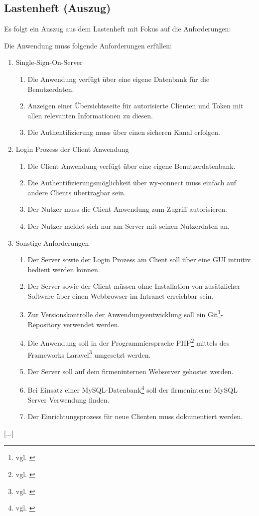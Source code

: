 \newpage
\subsection{Lastenheft (Auszug)}
\label{app:Lastenheft}
Es folgt ein Auszug aus dem Lastenheft mit Fokus auf die Anforderungen:

Die Anwendung muss folgende Anforderungen erfüllen: 
\begin{enumerate}[itemsep=0em,partopsep=0em,parsep=0em,topsep=0em]
\item Single-Sign-On-Server
	\begin{enumerate}
	\item Die Anwendung verfügt über eine eigene Datenbank für die Benutzerdaten.
	\item Anzeigen einer Übersichtsseite für autorisierte Clienten und Token mit allen relevanten Informationen zu diesen.
	\item Die Authentifizierung muss über einen sicheren Kanal erfolgen.
	\end{enumerate}
\item Login Prozess der Client Anwendung
	\begin{enumerate}
	\item Die Client Anwendung verfügt über eine eigene Benutzerdatenbank.
	\item Die Authentifizierungsmöglichkeit über wy-connect muss einfach auf andere Clients übertragbar sein.
	\item Der Nutzer muss die Client Anwendung zum Zugriff autorisieren.
	\item Der Nutzer meldet sich nur am Server mit seinen Nutzerdaten an.
	\end{enumerate}
\item Sonstige Anforderungen
	\begin{enumerate}
	\item Der Server sowie der Login Prozess am Client soll über eine \acs{GUI} intuitiv bedient werden können.
	\item Der Server sowie der Client müssen ohne Installation von zusätzlicher Software über einen
Webbrowser im Intranet erreichbar sein. 
	\item Zur Versionskontrolle der Anwendungsentwicklung soll ein Git\footnote{vgl. \cite{Git}}-Repository
verwendet werden.
	\item Die Anwendung soll in der Programmiersprache \acs{PHP}\footnote{vgl. \cite{PHP}} mittels des Frameworks Laravel\footnote{vgl. \cite{Laravel}} umgesetzt werden.	
	\item Der Server soll auf dem firmeninternen Webserver gehostet
werden.
	\item Bei Einsatz einer MySQL-Datenbank\footnote{vgl. \cite{MySQL}} soll der firmeninterne MySQL Server Verwendung
finden.
	\item Der Einrichtungsprozess für neue Clienten muss dokumentiert werden.
	\end{enumerate}
\end{enumerate}
		{[...]}



